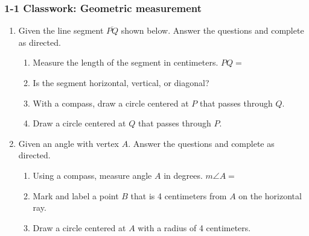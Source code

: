\documentclass[12pt, oneside]{article}
\begin{document}
\subsubsection*{1-1 Classwork: Geometric measurement}
  \vspace{0.5cm}
  \begin{enumerate}

  \item Given the line segment $\overline{PQ}$ shown below. Answer the questions and complete as directed.
    \begin{enumerate}
      \item Measure the length of the segment in centimeters. $PQ=$
      \bigskip
      \item Is the segment horizontal, vertical, or diagonal?
      \bigskip
      \item With a compass, draw a circle centered at $P$ that passes through $Q$.
      \bigskip
      \item Draw a circle centered at $Q$ that passes through $P$.
    \end{enumerate}
    \vspace{7cm}
    \begin{center}
    \end{center}
  
  \newpage

  \item Given an angle with vertex $A$. Answer the questions and complete as directed.
    \begin{enumerate}
      \item Using a compass, measure angle $A$ in degrees. $m\angle A =$
      \bigskip
      \item Mark and label a point $B$ that is 4 centimeters from $A$ on the horizontal ray.
      \bigskip
      \item Draw a circle centered at $A$ with a radius of 4 centimeters. \bigskip
    \end{enumerate}
    \vspace{3cm}
    \begin{center}
    \end{center}
\newpage


\end{enumerate}
\end{document}
